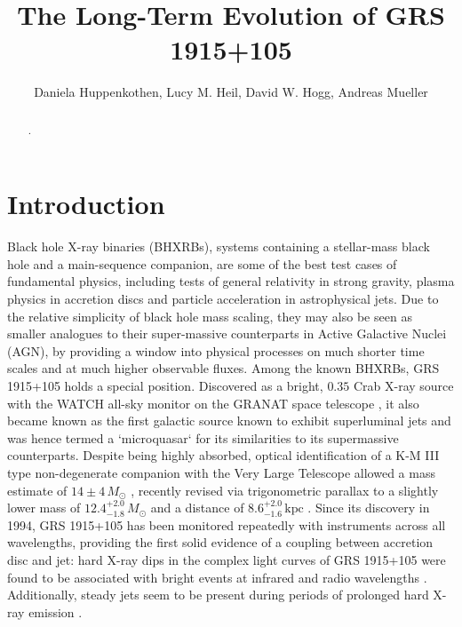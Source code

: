 \documentclass[12pt]{emulateapj}
\begin{document}
\title{The Long-Term Evolution of GRS 1915+105}

\author{Daniela Huppenkothen, Lucy M. Heil, David W. Hogg, Andreas Mueller}
 
  

\begin{abstract}
.

\end{abstract}


\section{Introduction}

Black hole X-ray binaries (BHXRBs), systems containing a stellar-mass black hole and a main-sequence companion, are some of the best test cases of fundamental physics, including tests of general relativity in strong gravity, plasma physics in accretion discs and particle acceleration in astrophysical jets. 
Due to the relative simplicity of black hole mass scaling, they may also be seen as smaller analogues to their super-massive counterparts in Active Galactive Nuclei (AGN), by providing a window into physical processes on much shorter time scales and at much higher observable fluxes.
Among the known BHXRBs, GRS 1915+105 holds a special position. Discovered as a bright, $0.35$ Crab X-ray source \citep{castrotirado1994} with the WATCH all-sky monitor on the GRANAT space telescope \citep{castrotirado1992}, it also became known as the first galactic source known to exhibit superluminal jets \citep{mirabel1994, fender1999} and was hence termed a `microquasar` for its similarities to its supermassive counterparts. 
Despite being highly absorbed, optical identification of a K-M III type non-degenerate companion with the Very Large Telescope allowed a mass estimate of $14\pm 4\,M_\odot$ \citep{greiner2001}, recently revised via trigonometric parallax to a slightly lower mass of $12.4^{+2.0}_{-1.8}\, M_\odot$ and a distance of $8.6^{+2.0}_{-1.6}\,\mathrm{kpc}$ \citep{reid2014}. 
Since its discovery in 1994, GRS 1915+105 has been monitored repeatedly with instruments across all wavelengths, providing the first solid evidence of a coupling between accretion disc and jet: hard X-ray dips in the complex light curves of GRS 1915+105 were found to be associated with bright events at infrared and radio wavelengths \citep{pooley1997, eikenberry1998a, eikenberry1998b, kleinwolt2002}. Additionally, steady jets seem to be present during periods of prolonged hard X-ray emission \citep{foster1996, dhawan2000, fuchs2003}. 
\end{document}
